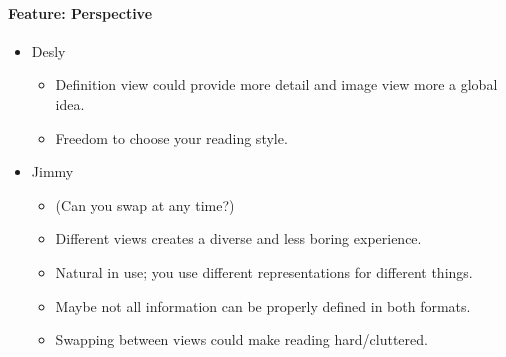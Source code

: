 \documentclass[main.tex]{subfiles}
\begin{document}
\paragraph{Feature: Perspective}
\begin{itemize}
	\item Desly
		\begin{itemize}
			\item Definition view could provide more detail and image view more a global idea.
			\item Freedom to choose your reading style.
		\end{itemize}
	\item Jimmy
		\begin{itemize}
			\item (Can you swap at any time?)
			\item Different views creates a diverse and less boring experience.
			\item Natural in use; you use different representations for different things.
			\item Maybe not all information can be properly defined in both formats.
			\item Swapping between views could make reading hard/cluttered.
		\end{itemize}
\end{itemize}
\end{document}
